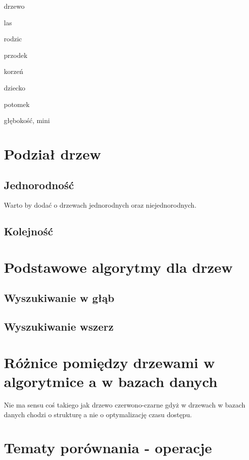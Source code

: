 \begin{description}
    \item[]
    \item drzewo
    \item las
    \item rodzic
    \item przodek
    \item korzeń
    \item dziecko
    \item potomek
    \item głębokość, mini
\begin{description}

\section{Podział drzew}
\subsection{Jednorodność}
Warto by dodać o drzewach jednorodnych oraz niejednorodnych.

\subsection{Kolejność}


\section{Podstawowe algorytmy dla drzew}
\subsection{Wyszukiwanie w głąb}
\subsection{Wyszukiwanie wszerz}


\section{Różnice pomiędzy drzewami w algorytmice a w bazach danych}

Nie ma sensu coś takiego jak drzewo czerwono-czarne gdyż w drzewach w bazach danych chodzi o strukturę a nie o optymalizację czasu dostępu.

\section{Tematy porównania - operacje}




\end{description}
\end{description}
